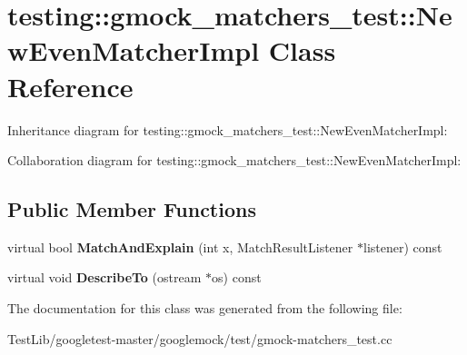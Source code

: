 \hypertarget{classtesting_1_1gmock__matchers__test_1_1NewEvenMatcherImpl}{}\section{testing\+:\+:gmock\+\_\+matchers\+\_\+test\+:\+:New\+Even\+Matcher\+Impl Class Reference}
\label{classtesting_1_1gmock__matchers__test_1_1NewEvenMatcherImpl}


Inheritance diagram for testing\+:\+:gmock\+\_\+matchers\+\_\+test\+:\+:New\+Even\+Matcher\+Impl\+:


Collaboration diagram for testing\+:\+:gmock\+\_\+matchers\+\_\+test\+:\+:New\+Even\+Matcher\+Impl\+:
\subsection*{Public Member Functions}
\begin{DoxyCompactItemize}
\item 
\mbox{\label{classtesting_1_1gmock__matchers__test_1_1NewEvenMatcherImpl_a56819af55d88569fdfaa51b937f76337}} 
virtual bool {\bfseries Match\+And\+Explain} (int x, Match\+Result\+Listener $\ast$listener) const
\item 
\mbox{\label{classtesting_1_1gmock__matchers__test_1_1NewEvenMatcherImpl_aece368c865501da4b30620d06a2690cd}} 
virtual void {\bfseries Describe\+To} (ostream $\ast$os) const
\end{DoxyCompactItemize}


The documentation for this class was generated from the following file\+:\begin{DoxyCompactItemize}
\item 
Test\+Lib/googletest-\/master/googlemock/test/gmock-\/matchers\+\_\+test.\+cc\end{DoxyCompactItemize}
